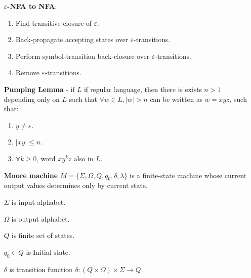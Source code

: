 \documentclass[a4paper,10pt]{article}
\newcommand{\alphabet}[1]{\Sigma{#1}}
\begin{document}
\begin{terms}
    \item 
    \textbf{$\varepsilon$-NFA to NFA}:
    \begin{enumerate}
        \item
        Find transitive-closure of $\varepsilon$.

        \item
        Back-propagate accepting states over $\varepsilon$-transitions.

        \item 
        Perform symbol-transition back-closure over $\varepsilon$-transitions.

        \item
        Remove $\varepsilon$-transitions.
    \end{enumerate}

    \item 
    \textbf{Pumping Lemma} - if $L$ if regular language, then there is exists $n > 1$ depending only on $L$ such that $\forall w \in L, |w| > n$ can be written as $w = xyz$, such that:
    \begin{enumerate}
        \item 
        $y \not= \varepsilon$.

        \item
        $|xy| \leq n$.

        \item 
        $\forall k \geq 0$, word $xy^kz$ also in $L$.
    \end{enumerate}

    \item
    \textbf{Moore machine} $M = \{\Sigma, \Omega, Q, q_0, \delta, \lambda\}$ is a finite-state machine whose current output values determines only by current state.
    \begin{terms}
        \item 
        $\alphabet{}$ is input alphabet.

        \item 
        $\Omega$ is output alphabet.

        \item 
        $Q$ is finite set of states.

        \item 
        $q_0 \in Q$ is Initial state.

        \item 
        $\delta$ is transition function $\delta: (Q \times \Omega) \times \alphabet{} \rightarrow Q$.


\end{terms}
\end{terms}
\end{document}
